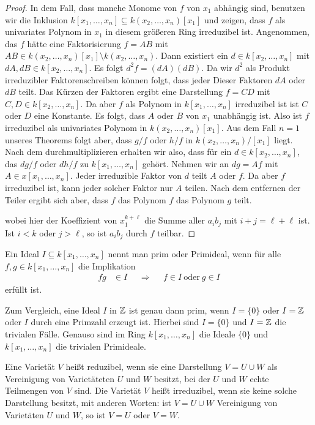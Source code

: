 \documentclass[11pt]{article}
\numberwithin{equation}{section}
\begin{document}
\begin{proof}
	In dem Fall, dass manche Monome von $f$ von $x_1$ abhängig sind, benutzen wir die Inklusion $k[x_1,\ldots,x_n] \subseteq k(x_2,\ldots,x_n) [x_1]$ und zeigen, dass $f$ als univariates Polynom in $x_1$ in diesem größeren Ring irreduzibel ist. Angenommen, das $f$ hätte eine Faktorisierung $f = AB$ mit $AB  \in k(x_2,\ldots, x_n) [x_1] \setminus k(x_2,\ldots,x_n)$. Dann existiert ein $d \in k[x_2,\ldots,x_n]$ mit  $d A , d B \in k[x_2,\ldots,x_n]$. Es folgt 
	$d^2 f = (d A)  (d B)$. Da wir $d^2$ als Produkt irreduzibler Faktorenschreiben können folgt, dass jeder Dieser Faktoren $dA $ oder $d B$ teilt. Das Kürzen der Faktoren ergibt eine Darstellung $ f = C D$ mit $C, D \in k[x_2,\ldots,x_n]$. Da aber $f$ als Polynom in $k[x_1,\ldots,x_n]$ irreduzibel ist ist $C$ oder $D$ eine Konstante. Es folgt, dass $A$ oder $B$ von $x_1$ unabhängig ist. Also ist $f$ irreduzibel als univariates Polynom in $k(x_2,\ldots,x_n) [x_1]$. Aus dem Fall $n=1$ unseres Theorems folgt aber, dass $g /f$ oder $h / f$ in $k(x_2,\ldots,x_n) / [x_1]$ liegt. Nach dem durchmultiplizieren erhalten wir also, dass für ein $d \in k[x_2,\ldots,x_n]$, das $d  g / f $ oder $d h / f$ zu $k[x_1,\ldots,x_n]$ gehört. Nehmen wir an $d g = A f$ mit $A \in x[x_1,\ldots,x_n]$. Jeder irreduzible Faktor von $d$ teilt $A$ oder $f$. Da aber $f$ irreduzibel ist, kann jeder solcher Faktor nur $A$ teilen. Nach dem entfernen der Teiler ergibt sich aber, dass $f$ das Polynom $f$ das Polynom $g$ teilt. 
	
	
	wobei hier der Koeffizient von $x_1^{k+\ell}$ die Summe aller $a_i b_j$ mit $i+ j = \ell+ \ell$ ist. Ist $i < k$ oder $j > \ell$, so ist $a_i b_j$ durch $f$ teilbar. 
\end{proof} 


\begin{definition}
	Ein Ideal $I \subseteq k[x_1,\ldots,x_n]$ nennt man prim oder Primideal, wenn für alle $f,g \in k[x_1,\ldots,x_n]$ die Implikation 
	\begin{align*}
			fg & \in I & & \Longrightarrow &  & f \in I \ \text{oder} \ g \in I 
	\end{align*}
	erfüllt ist. 
\end{definition} 
Zum Vergleich, eine Ideal $I$ in $\mathbb{Z}$ ist genau dann prim, wenn $I= \{0\}$ oder $I= \mathbb{Z}$ oder $I$ durch eine Primzahl erzeugt ist. Hierbei sind $I= \{0\}$ und $I=\mathbb{Z}$ die trivialen Fälle. Genauso sind im Ring $k[x_1,\ldots,x_n]$ die Ideale $\{0\}$ und $k[x_1,\ldots,x_n]$ die trivialen Primideale. 

\begin{definition}
	Eine Varietät $V$ heißt reduzibel, wenn sie eine Darstellung $V = U \cup W$ als Vereinigung von Varietäteten $U$ und $W$ besitzt, bei der $U$ und $W$ echte Teilmengen von $V$ sind. Die Varietät $V$ heißt irreduzibel, wenn sie keine solche Darstellung besitzt, mit anderen Worten: ist $V = U \cup W$ Vereinigung von Varietäten $U$ und $W$, so ist $V=U$ oder $V=W$. 
\end{definition} 
\end{document}
